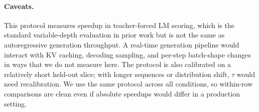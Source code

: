 \paragraph{Caveats.}
This protocol measures speedup in teacher-forced LM scoring, which is the standard variable-depth evaluation in prior work but is not the same as autoregressive generation throughput.
A real-time generation pipeline would interact with KV caching, decoding sampling, and per-step batch-shape changes in ways that we do not measure here.
The protocol is also calibrated on a relatively short held-out slice; with longer sequences or distribution shift, $\tau$ would need recalibration.
We use the same protocol across all conditions, so within-row comparisons are clean even if absolute speedups would differ in a production setting.
